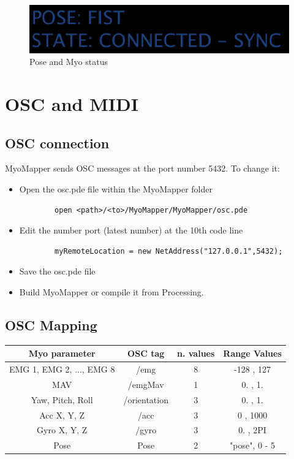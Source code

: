 \documentclass[12pt,a4paper]{article}
\begin{document}
	\begin{figure}[h]
		\centering
		\includegraphics[width=0.6\linewidth]{../MyoMapper-Pose-Status}
		\caption{Pose and Myo status}
		\label{fig:MyoMapper-Pose-Status}
	\end{figure}	
		 
\newpage
\section{OSC and MIDI}
	\subsection{OSC connection}
	
	MyoMapper sends OSC messages at the port number 5432. To change it:
	
	\begin{itemize}
	\item  Open the osc.pde file within the MyoMapper folder
		\begin{verbatim}
		open <path>/<to>/MyoMapper/MyoMapper/osc.pde
		\end{verbatim}
	\item Edit the number port (latest number) at the 10th code line
		\begin{verbatim}
	    myRemoteLocation = new NetAddress("127.0.0.1",5432);
	    \end{verbatim}
	\item Save the osc.pde file
	\item Build MyoMapper or compile it from Processing.
    \end{itemize}
	\subsection{OSC Mapping}
	
	\begin{tabular}{|c|c|c|c|}\hline
		\textbf{Myo parameter}   & \textbf{OSC tag} & \textbf{n. values} & \textbf{Range Values} \\ \hline
		EMG 1, EMG 2, ..., EMG 8 &  /emg        & 8         &  -128 , 127  \\ \hline
		MAV                      & /emgMav      & 1         & 0. , 1.      \\\hline 
		Yaw, Pitch, Roll         & /orientation	& 3         & 0. , 1.      \\ \hline
		Acc X, Y, Z              & /acc         & 3         & 0 , 1000     \\ \hline
		Gyro X, Y, Z             & /gyro        & 3         & 0. , 2PI     \\ \hline
		Pose                     & Pose         & 2         & "pose", 0 - 5 \\ \hline
	\end{tabular} \\ \ \\
	
\end{document}
